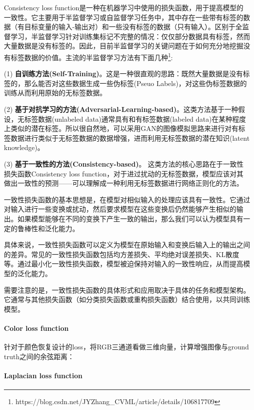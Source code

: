 \documentclass[letterpaper,12pt]{article}
\begin{document}
	Consistency loss function是一种在机器学习中使用的损失函数，用于提高模型的一致性。它主要用于半监督学习或自监督学习任务中，其中存在一些带有标签的数据（有目标变量的输入-输出对）和一些没有标签的数据（只有输入）。区别于全监督学习，半监督学习针对训练集标记不完整的情况：仅仅部分数据具有标签，然而大量数据是没有标签的。因此，目前半监督学习的关键问题在于如何充分地挖掘没有标签数据的价值。主流的半监督学习方法有下面几种\footnote{https://blog.csdn.net/JYZhang\_CVML/article/details/106817709}:
	
	(1) \textbf{自训练方法(Self-Training)}。这是一种很直观的思路：既然大量数据是没有标签的，那么能否对这些数据生成一些伪标签(Pseuo Labels)，对这些伪标签数据的训练从而利用原始的无标签数据。
	
	(2) \textbf{基于对抗学习的方法(Adversarial-Learning-based)}。这类方法基于一种假设，无标签数据(unlabeled data)通常具有和有标签数据(labeled data)在某种程度上类似的潜在标签。所以很自然地，可以采用GAN的图像模拟思路来进行对有标签数据进行类似于无标签数据的数据增强，进而利用无标签数据的潜在知识(latent knowledge)。
	
	(3) \textbf{基于一致性的方法(Consistency-based)}。 这类方法的核心思路在于一致性损失函数Consistency loss function，对于进过扰动的无标签数据，模型应该对其做出一致性的预测——可以理解成一种利用无标签数据进行网络正则化的方法。
	
	一致性损失函数的基本思想是，在模型对相似输入的处理应该具有一致性。它通过对输入进行一些变换或扰动，然后要求模型在这些变换后仍然能够产生相似的输出。如果模型能够在不同的变换下产生一致的输出，那么我们可以认为模型具有一定的鲁棒性和泛化能力。
	
	具体来说，一致性损失函数可以定义为模型在原始输入和变换后输入上的输出之间的差异。常见的一致性损失函数包括均方差损失、平均绝对误差损失、KL散度等。通过最小化一致性损失函数，模型被迫保持对输入的一致性响应，从而提高模型的泛化能力。
	
	需要注意的是，一致性损失函数的具体形式和应用取决于具体的任务和模型架构。它通常与其他损失函数（如分类损失函数或重构损失函数）结合使用，以共同训练模型。
	
	\paragraph{Color loss function}
	
	针对于颜色恢复设计的loss，将RGB三通道看做三维向量，计算增强图像与ground truth之间的余弦距离：
	
	\paragraph{Laplacian loss function}
	
\end{document}
